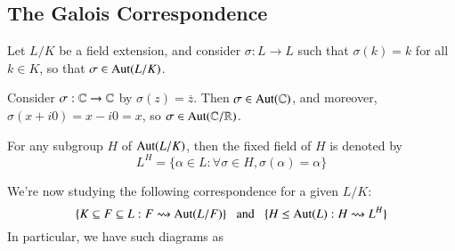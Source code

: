 \subsection{The Galois Correspondence}

Let $L/K$ be a field extension, and consider $\sigma:L\rightarrow L$ such that $\sigma(k) = k$ for all $k \in K$, so that $\sigma \in \operatorname{Aut}(L/K)$. 

\begin{example}
    Consider $\sigma:\mathbb C\rightarrow \mathbb C$ by $\sigma(z) = \overline{z}$. Then $\sigma \in \operatorname{Aut}(\mathbb C)$, and moreover, $\sigma(x+i0) = x-i0 = x$, so $\sigma \in \operatorname{Aut}(\mathbb C/\mathbb R)$. 
\end{example}

\begin{definition}
    For any subgroup $H$ of $\operatorname{Aut}(L/K)$, then the fixed field of $H$ is denoted by $$L^H = \{\alpha \in L:\forall \sigma \in H,\sigma(\alpha) = \alpha\}$$
\end{definition}

We're now studying the following correspondence for a given $L/K$:\begin{equation*}
    \{K\subseteq F\subseteq L:F\rightsquigarrow \operatorname{Aut}(L/F)\}\;\;\text{ and }\;\;\{H\leq \operatorname{Aut}(L):H\rightsquigarrow L^H\}
\end{equation*}
In particular, we have such diagrams as 
\begin{center}
\end{center}

